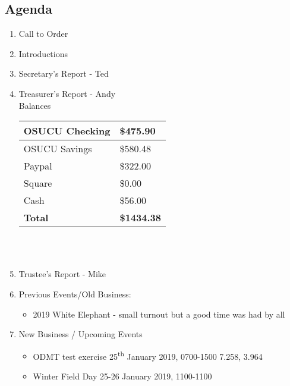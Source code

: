 \documentclass[letter,11pt]{extarticle}
\begin{document}
	\subsection*{Agenda}
	\begin{enumerate}
		\item Call to Order
		\item Introductions
		\item Secretary's Report - Ted
		\item Treasurer's Report - Andy \\
		Balances 
		\begin{tabular}{|l|l|} \hline
			OSUCU Checking & \$475.90 \\ \hline
			OSUCU Savings & \$580.48 \\ \hline
			Paypal & \$322.00 \\ \hline
			Square & \$0.00 \\ \hline
			Cash & \$56.00 \\ \hline
			\textbf{Total} & \textbf{\$1434.38} \\ \hline
		\end{tabular} \\ \\
		\item Trustee's Report - Mike
		\item Previous Events/Old Business:
		\begin{itemize}
			\item 2019 White Elephant - small turnout but a good time was had by all
		\end{itemize}
		
		\item  New Business / Upcoming Events
		\begin{itemize}
			\item ODMT test exercise 25\textsuperscript{th} January 2019, 0700-1500 7.258, 3.964
			\item Winter Field Day 25-26 January 2019, 1100-1100


\end{itemize}
\end{enumerate}
\end{document}
